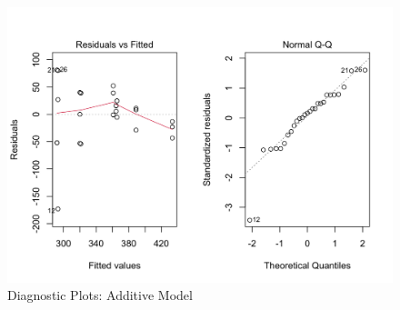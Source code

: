 \documentclass[11pt,a4paper]{article}
\begin{document}
\begin{figure}[htb]
    \centering
    \includegraphics[scale=0.3]{DP1}
    \caption{Diagnostic Plots: Additive Model}
    \label{}
\end{figure}
\end{document}
